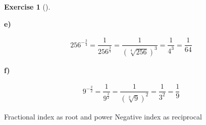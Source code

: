 \documentclass[
  letterpaper,
  DIV=11,
  numbers=noendperiod]{scrreprt}
\theoremstyle{definition}
\newtheorem{exercise}{Exercise}[chapter]
\theoremstyle{remark}
\begin{document}
\begin{exercise}[]
\begin{tcolorbox}
\textbf{e)}

\[
\begin{aligned}
256^{-\frac{3}{4}} = \dfrac{1}{256^{\frac{3}{4}}}= \dfrac{1}{\left(\sqrt[4]{256}\right)^{3}}= \dfrac{1}{4^{3}} = \dfrac{1}{64}
\end{aligned}
\]

\textbf{f)}

\[
\begin{aligned}
9^{-\frac{2}{2}} = \dfrac{1}{9^{\frac{2}{2}}}= \dfrac{1}{\left(\sqrt[2]{9}\right)^{2}}= \dfrac{1}{3^{2}} = \dfrac{1}{9}
\end{aligned}
\]

\end{tcolorbox}

{Fractional index as root and power} {Negative index as reciprocal}

\end{exercise}
\end{document}
